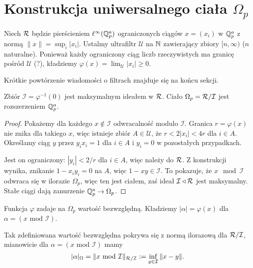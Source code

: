 \section{Konstrukcja uniwersalnego ciała $\Omega_p$}
Niech $\mathcal R$ będzie pierścieniem $\ell^\infty(\mathbb Q_p^a)$ ograniczonych ciągów $x = (x_i)$ w $\mathbb Q_p^a$ z normą $\|x\| = \sup_i |x_i|$. 
Ustalmy ultrafiltr $\mathcal U$ na $\mathbb N$ zawierający zbiory $[n, \infty)$ ($n$ naturalne).
Ponieważ każdy ograniczony ciąg liczb rzeczywistych ma granicę pośród $\mathcal U$ (?), kładziemy $\varphi(x) = \lim_{\mathcal U} |x_i| \ge 0$.

Krótkie powtórzenie wiadomości o filtrach znajduje się na końcu sekcji.

\begin{fakt}
	Zbiór $\mathcal I = \varphi^{-1}(0)$ jest maksymalnym ideałem w $\mathcal R$.
	Ciało $\Omega_p = \mathcal R / \mathcal I$ jest rozszerzeniem $\mathbb Q_p^a$.
\end{fakt}

\begin{proof}
	Pokażemy dla każdego $x \not \in \mathcal I$ odwracalność modulo $\mathcal I$.
	Granica $r = \varphi(x)$ nie znika dla takiego $x$, więc istnieje zbiór $A \in \mathcal U$, że $r < 2 |x_i| < 4r$ dla $i \in A$.
	Określamy ciąg $y$ przez $y_i x_i = 1$ dla $i \in A$ i $y_i = 0$ w pozostałych przypadkach.

	Jest on ograniczony: $|y_i| < 2 / r$ dla $i \in A$, więc należy do $\mathcal R$.
	Z konstrukcji wynika, znikanie $1 - x_iy_i = 0$ na $A$, więc $1 - xy \in \mathcal I$.
	To pokazuje, że $x \mod \mathcal I$ odwraca się w ilorazie $\Omega_p$, więc ten jest ciałem, zaś ideał $\mathcal I \triangleleft \mathcal R$ jest maksymalny.
	Stałe ciągi dają zanurzenie $\mathbb Q_p^a \to \Omega_p$.
\end{proof}

Funkcja $\varphi$ zadaje na $\Omega_p$ wartość bezwzględną.
Kładziemy $|\alpha| = \varphi(x)$ dla $\alpha = (x \mbox{ mod } \mathcal I)$.

\begin{fakt}
	Tak zdefiniowana wartość bezwzględna pokrywa się z normą ilorazową dla $\mathcal R / \mathcal I$, mianowicie dla $\alpha = (x \mbox { mod } \mathcal I)$ mamy
	\[
		|\alpha|_\Omega = \|x \mbox{ mod }\mathcal I\|_{\mathcal R / \mathcal I} := \inf_{y \in \mathcal I} \|x - y\|.
	\]
\end{fakt}

